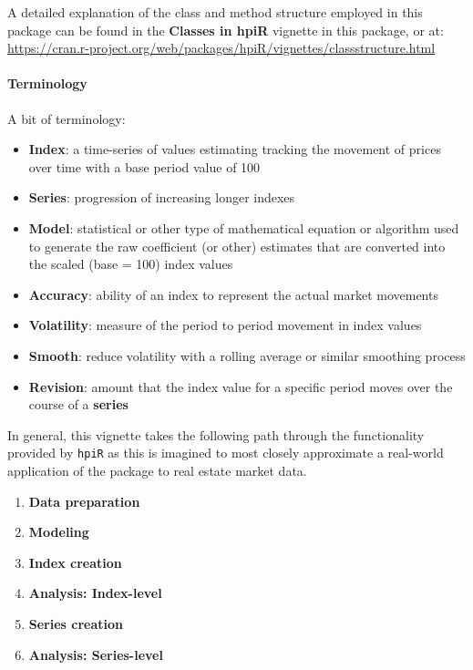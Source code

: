 \documentclass[]{article}
\providecommand{\tightlist}{%
  \setlength{\itemsep}{0pt}\setlength{\parskip}{0pt}}
\let\oldparagraph\paragraph
\renewcommand{\paragraph}[1]{\oldparagraph{#1}\mbox{}}
\begin{document}
A detailed explanation of the class and method structure employed in
this package can be found in the \textbf{Classes in hpiR} vignette in
this package, or at:
\url{https://cran.r-project.org/web/packages/hpiR/vignettes/classstructure.html}

\paragraph{Terminology}\label{terminology}

A bit of terminology:

\begin{itemize}
\tightlist
\item
  \textbf{Index}: a time-series of values estimating tracking the
  movement of prices over time with a base period value of 100
\item
  \textbf{Series}: progression of increasing longer indexes\\
\item
  \textbf{Model}: statistical or other type of mathematical equation or
  algorithm used to generate the raw coefficient (or other) estimates
  that are converted into the scaled (base = 100) index values
\item
  \textbf{Accuracy}: ability of an index to represent the actual market
  movements
\item
  \textbf{Volatility}: measure of the period to period movement in index
  values
\item
  \textbf{Smooth}: reduce volatility with a rolling average or similar
  smoothing process
\item
  \textbf{Revision}: amount that the index value for a specific period
  moves over the course of a \textbf{series}
\end{itemize}

In general, this vignette takes the following path through the
functionality provided by \texttt{hpiR} as this is imagined to most
closely approximate a real-world application of the package to real
estate market data.

\begin{enumerate}
\def\labelenumi{\arabic{enumi}.}
\tightlist
\item
  \textbf{Data preparation}
\item
  \textbf{Modeling}
\item
  \textbf{Index creation}
\item
  \textbf{Analysis: Index-level}
\item
  \textbf{Series creation}
\item
  \textbf{Analysis: Series-level}
\end{enumerate}
\end{document}
